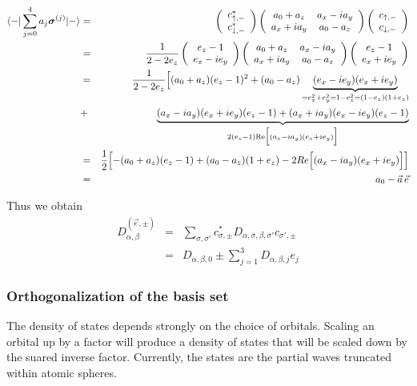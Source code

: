 \documentclass[11pt,a4paper]{report}
\begin{document}
\begin{eqnarray}
\langle -|\sum_{j=0}^4 a_j\bm{\sigma}^{(j)}|-\rangle
&=&
\left(\begin{array}{c}
c_{\uparrow,-}^*\\c_{\downarrow,-}^*
\end{array}\right)
\left(\begin{array}{cc}
a_0+a_z&a_x-ia_y\\
a_x+ia_y & a_0-a_z
\end{array}\right)
\left(\begin{array}{c}
c_{\uparrow,-}\\c_{\downarrow,-}
\end{array}\right)
\nonumber\\
&=&
\frac{1}{2-2e_z}
\left(\begin{array}{c}
e_z-1\\e_x-ie_y
\end{array}\right)
\left(\begin{array}{cc}
a_0+a_z&a_x-ia_y\\
a_x+ia_y & a_0-a_z
\end{array}\right)
\left(\begin{array}{c}
e_z-1\\e_x+ie_y
\end{array}\right)
\nonumber\\
&=&\frac{1}{2-2e_z}
\Bigl[(a_0+a_z)(e_z-1)^2
+(a_0-a_z)
\underbrace{(e_x-ie_y)(e_x+ie_y)}_{=e_x^2+e_y^2=1-e_z^2=(1-e_z)(1+e_z)}
\nonumber\\
&+&
\underbrace{(a_x-ia_y)(e_x+ie_y)(e_z-1)
+(a_x+ia_y)(e_x-ie_y)(e_z-1)}_{2(e_z-1)\mathrm{Re}\Bigl[(a_x-ia_y)(e_x+ie_y)\Bigr]}
\nonumber\\
&=&\frac{1}{2}
\Bigl[
-(a_0+a_z)(e_z-1)
+(a_0-a_z)(1+e_z)
-2Re\Bigl[(a_x-ia_y)(e_x+ie_y)\Bigr]
\Bigr]
\nonumber\\
&=&a_0-\vec{a}\,\vec{e}
\end{eqnarray}

Thus we obtain
\begin{eqnarray}
D^{(\vec{e},\pm)}_{\alpha,\beta}
&=&\sum_{\sigma,\sigma'}c^*_{\sigma,\pm} D_{\alpha,\sigma,\beta,\sigma'} 
c_{\sigma',\pm}
\nonumber\\
&=&D_{\alpha,\beta,0}\pm\sum_{j=1}^3 D_{\alpha,\beta,j}e_j
\end{eqnarray}

\subsubsection{Orthogonalization of the basis set}
The density of states depends strongly on the choice of orbitals.
Scaling an orbital up by a factor will produce a density of states
that will be scaled down by the suared inverse factor.  Currently, the
states are the partial waves truncated within atomic spheres.
\end{document}
